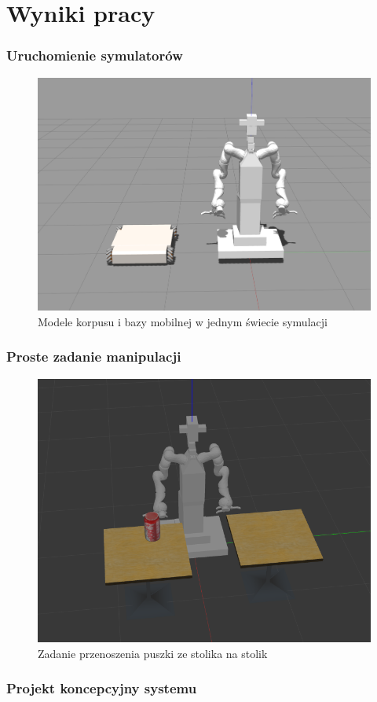 \section{Wyniki pracy}


\begin{frame}
    \frametitle{Uruchomienie symulatorów}
    \begin{figure}
        \includegraphics[scale=0.20]{./images/velma+omnivelma_cropped.png}
        \caption{Modele korpusu i bazy mobilnej w jednym świecie symulacji}
    \end{figure}
\end{frame}


\begin{frame}
    \frametitle{Proste zadanie manipulacji}
    \begin{figure}
        \includegraphics[scale=0.35]{./images/velma_stero_task.png}
        \caption{Zadanie przenoszenia puszki ze stolika na stolik}
    \end{figure}
\end{frame}


\begin{frame}
	\frametitle{Projekt koncepcyjny systemu}
\end{frame}

